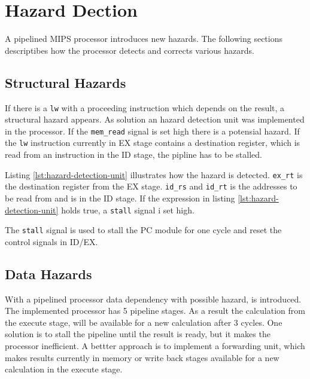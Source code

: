 \section{Hazard Dection}
A pipelined MIPS processor introduces new hazards.
The following sections descriptibes how the processor detects and corrects various hazards.

\subsection{Structural Hazards}
If there is a \texttt{lw} with a proceeding instruction which depends on the result,
a structural hazard appears.
As solution an hazard detection unit was implemented in the processor.
If the \texttt{mem\_read} signal is set high there is a potensial hazard.
If the \texttt{lw} instruction currently in EX stage contains a destination register,
which is read from an instruction in the ID stage, the pipline has to be stalled.

Listing \ref{lst:hazard-detection-unit} illustrates how the hazard is detected.
\texttt{ex\_rt} is the destination register from the EX stage.
\texttt{id\_rs} and \texttt{id\_rt} is the addresses to be read from and is in the ID stage.
If the expression in listing \ref{lst:hazard-detection-unit} holds true, a \texttt{stall} signal i set high.

The \texttt{stall} signal is used to stall the PC module for one cycle and reset the control signals in ID/EX.


\subsection{Data Hazards}
With a pipelined processor data dependency with possible hazard, is introduced.
The implemented processor has 5 pipeline stages.
As a result the calculation from the execute stage, will be available for a new calculation after 3 cycles.
One solution is to stall the pipeline until the result is ready, but it makes the processor inefficient.
A bettter approach is to implement a forwarding unit,
which makes results currently in memory or write back stages available for a new calculation in the execute stage.

